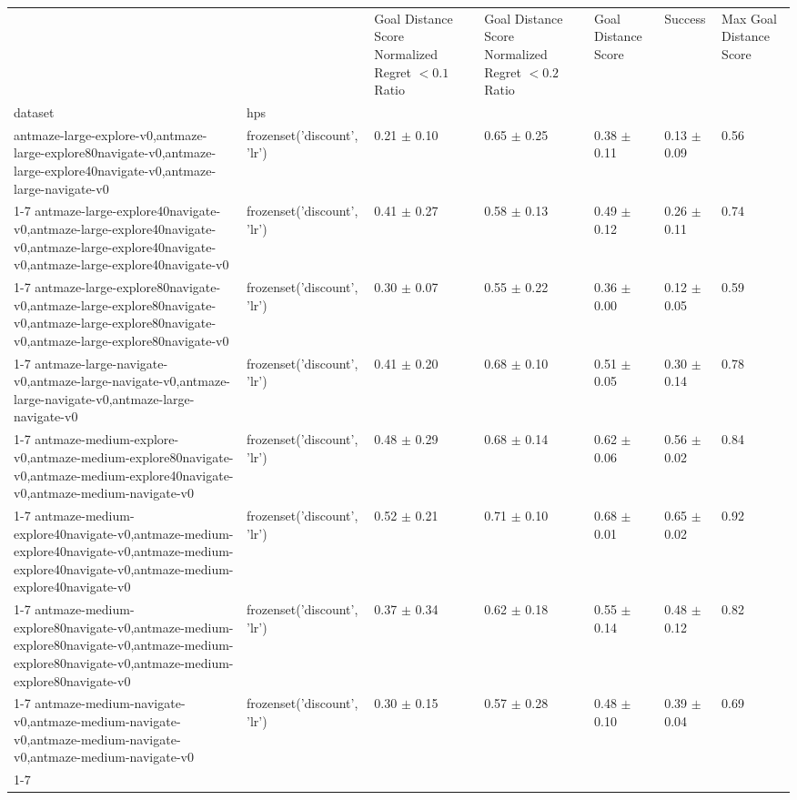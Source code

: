 \begin{tabular}{lllllll}
\toprule
 &  & Goal Distance Score Normalized Regret $< 0.1$ Ratio & Goal Distance Score Normalized Regret $< 0.2$ Ratio & Goal Distance Score & Success & Max Goal Distance Score \\
dataset & hps &  &  &  &  &  \\
\midrule
antmaze-large-explore-v0,antmaze-large-explore80navigate-v0,antmaze-large-explore40navigate-v0,antmaze-large-navigate-v0 & frozenset({'discount', 'lr'}) & 0.21 $\pm$ 0.10 & 0.65 $\pm$ 0.25 & 0.38 $\pm$ 0.11 & 0.13 $\pm$ 0.09 & 0.56 \\
\cline{1-7}
antmaze-large-explore40navigate-v0,antmaze-large-explore40navigate-v0,antmaze-large-explore40navigate-v0,antmaze-large-explore40navigate-v0 & frozenset({'discount', 'lr'}) & 0.41 $\pm$ 0.27 & 0.58 $\pm$ 0.13 & 0.49 $\pm$ 0.12 & 0.26 $\pm$ 0.11 & 0.74 \\
\cline{1-7}
antmaze-large-explore80navigate-v0,antmaze-large-explore80navigate-v0,antmaze-large-explore80navigate-v0,antmaze-large-explore80navigate-v0 & frozenset({'discount', 'lr'}) & 0.30 $\pm$ 0.07 & 0.55 $\pm$ 0.22 & 0.36 $\pm$ 0.00 & 0.12 $\pm$ 0.05 & 0.59 \\
\cline{1-7}
antmaze-large-navigate-v0,antmaze-large-navigate-v0,antmaze-large-navigate-v0,antmaze-large-navigate-v0 & frozenset({'discount', 'lr'}) & 0.41 $\pm$ 0.20 & 0.68 $\pm$ 0.10 & 0.51 $\pm$ 0.05 & 0.30 $\pm$ 0.14 & 0.78 \\
\cline{1-7}
antmaze-medium-explore-v0,antmaze-medium-explore80navigate-v0,antmaze-medium-explore40navigate-v0,antmaze-medium-navigate-v0 & frozenset({'discount', 'lr'}) & 0.48 $\pm$ 0.29 & 0.68 $\pm$ 0.14 & 0.62 $\pm$ 0.06 & 0.56 $\pm$ 0.02 & 0.84 \\
\cline{1-7}
antmaze-medium-explore40navigate-v0,antmaze-medium-explore40navigate-v0,antmaze-medium-explore40navigate-v0,antmaze-medium-explore40navigate-v0 & frozenset({'discount', 'lr'}) & 0.52 $\pm$ 0.21 & 0.71 $\pm$ 0.10 & 0.68 $\pm$ 0.01 & 0.65 $\pm$ 0.02 & 0.92 \\
\cline{1-7}
antmaze-medium-explore80navigate-v0,antmaze-medium-explore80navigate-v0,antmaze-medium-explore80navigate-v0,antmaze-medium-explore80navigate-v0 & frozenset({'discount', 'lr'}) & 0.37 $\pm$ 0.34 & 0.62 $\pm$ 0.18 & 0.55 $\pm$ 0.14 & 0.48 $\pm$ 0.12 & 0.82 \\
\cline{1-7}
antmaze-medium-navigate-v0,antmaze-medium-navigate-v0,antmaze-medium-navigate-v0,antmaze-medium-navigate-v0 & frozenset({'discount', 'lr'}) & 0.30 $\pm$ 0.15 & 0.57 $\pm$ 0.28 & 0.48 $\pm$ 0.10 & 0.39 $\pm$ 0.04 & 0.69 \\
\cline{1-7}
\bottomrule
\end{tabular}
